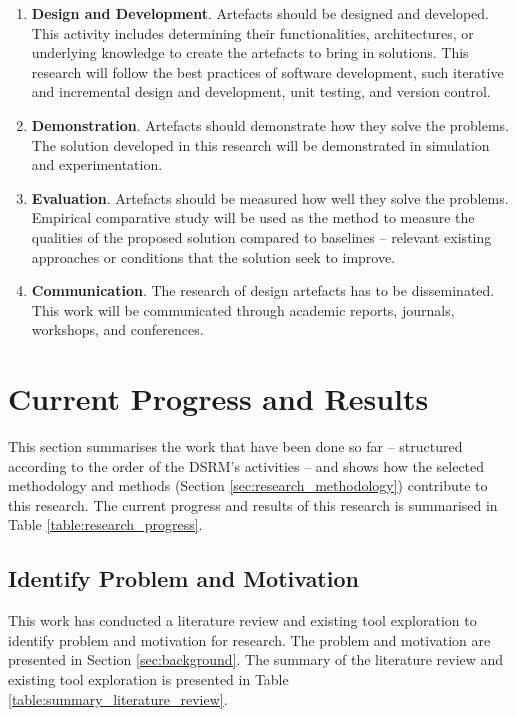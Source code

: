 \documentclass[12pt, a4paper]{report} \usepackage[titletoc]{appendix}
\begin{document}
\begin{enumerate}
    \item \textbf{Design and Development}. Artefacts should be designed and developed. This activity includes determining their functionalities, architectures, or underlying knowledge to create the artefacts to bring in solutions. This research will follow the best practices of software development, such iterative and incremental design and development, unit testing, and version control.
    \item \textbf{Demonstration}. Artefacts should demonstrate how they solve the problems. The solution developed in this research will be demonstrated in simulation and experimentation. 
    \item \textbf{Evaluation}. Artefacts should be measured how well they solve the problems. Empirical comparative study will be used as the method to measure the qualities of the proposed solution compared to baselines -- relevant existing approaches or conditions that the solution seek to improve.
    \item \textbf{Communication}. The research of design artefacts has to be disseminated. This work will be communicated through academic reports, journals, workshops, and conferences.
\end{enumerate}

\section{Current Progress and Results}
\label{sec:current_progress_and_results}
This section summarises the work that have been done so far -- structured according to the order of the DSRM's activities -- and shows how the selected methodology and methods (Section \ref{sec:research_methodology}) contribute to this research. The current progress and results of this research is summarised in Table \ref{table:research_progress}.

\subsection{Identify Problem and Motivation}
\label{subsec:identify_problem_and_motivation}
This work has conducted a literature review and existing tool exploration to identify problem and motivation for research. The problem and motivation are presented in Section \ref{sec:background}. The summary of the literature review and existing tool exploration is presented in Table \ref{table:summary_literature_review}.
\end{document}
